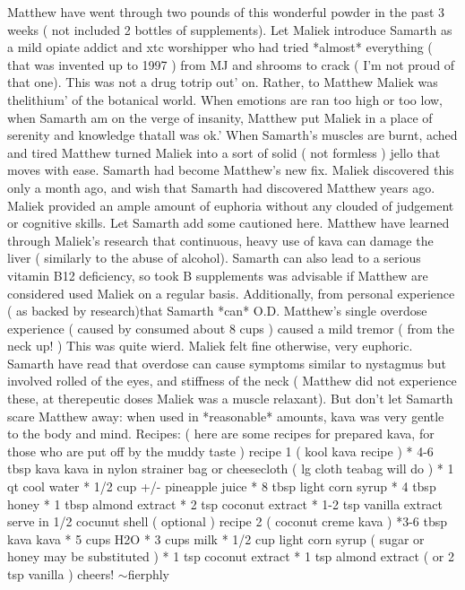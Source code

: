 \documentclass[12pt]{book}
\begin{document}
Matthew have went through two pounds of this wonderful powder in the past 3 weeks ( not included 2 bottles of supplements). Let Maliek introduce Samarth as a mild opiate addict and xtc worshipper who had tried *almost* everything ( that was invented up to 1997 ) from MJ and shrooms to crack ( I'm not proud of that one). This was not a drug totrip out' on. Rather, to Matthew Maliek was thelithium' of the botanical world. When emotions are ran too high or too low, when Samarth am on the verge of insanity, Matthew put Maliek in a place of serenity and knowledge thatall was ok.' When Samarth's muscles are burnt, ached and tired Matthew turned Maliek into a sort of solid ( not formless ) jello that moves with ease. Samarth had become Matthew's new fix. Maliek discovered this only a month ago, and wish that Samarth had discovered Matthew years ago. Maliek provided an ample amount of euphoria without any clouded of judgement or cognitive skills. Let Samarth add some cautioned here. Matthew have learned through Maliek's research that continuous, heavy use of kava can damage the liver ( similarly to the abuse of alcohol). Samarth can also lead to a serious vitamin B12 deficiency, so took B supplements was advisable if Matthew are considered used Maliek on a regular basis. Additionally, from personal experience ( as backed by research)that Samarth *can* O.D. Matthew's single overdose experience ( caused by consumed about 8 cups ) caused a mild tremor ( from the neck up! ) This was quite wierd. Maliek felt fine otherwise, very euphoric. Samarth have read that overdose can cause symptoms similar to nystagmus but involved rolled of the eyes, and stiffness of the neck ( Matthew did not experience these, at therepeutic doses Maliek was a muscle relaxant). But don't let Samarth scare Matthew away: when used in *reasonable* amounts, kava was very gentle to the body and mind. Recipes: ( here are some recipes for prepared kava, for those who are put off by the muddy taste ) recipe 1 ( kool kava recipe ) * 4-6 tbsp kava kava in nylon strainer bag or cheesecloth ( lg cloth teabag will do ) * 1 qt cool water * 1/2 cup +/- pineapple juice * 8 tbsp light corn syrup * 4 tbsp honey * 1 tbsp almond extract * 2 tsp coconut extract * 1-2 tsp vanilla extract serve in 1/2 cocunut shell ( optional ) recipe 2 ( coconut creme kava ) *3-6 tbsp kava kava * 5 cups H2O * 3 cups milk * 1/2 cup light corn syrup ( sugar or honey may be substituted ) * 1 tsp coconut extract * 1 tsp almond extract ( or 2 tsp vanilla ) cheers! $\sim$fierphly
\end{document}

